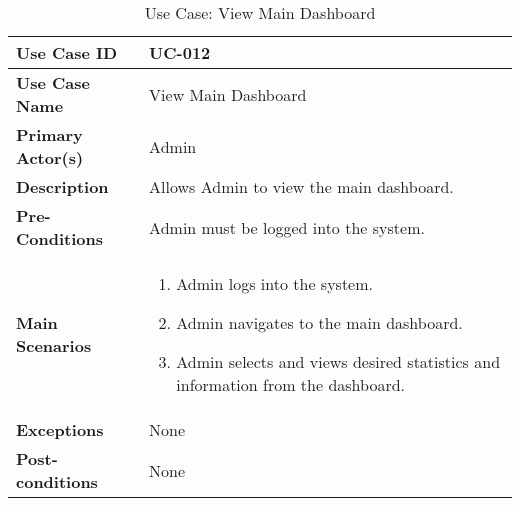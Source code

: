 \begin{table}[ht]
    \centering
    \begin{tabular}{|l|p{}|}
        \hline
        \textbf{Use Case ID} & UC-012 \\
        \hline
        \textbf{Use Case Name} & View Main Dashboard \\
        \hline
        \textbf{Primary Actor(s)} & Admin \\
        \hline
        \textbf{Description} & Allows Admin to view the main dashboard. \\
        \hline
        \textbf{Pre-Conditions} & Admin must be logged into the system. \\
        \hline
        \textbf{Main Scenarios} & 
        \begin{enumerate}[label=\arabic*.,itemsep=0pt]
            \item Admin logs into the system.
            \item Admin navigates to the main dashboard.
            \item Admin selects and views desired statistics and information from the dashboard.
        \end{enumerate} \\
        \hline
        \textbf{Exceptions} & None \\
        \hline
        \textbf{Post-conditions} & None \\
        \hline
    \end{tabular}
    \label{tab:use-case-view-main-dashboard}
    \caption{Use Case: View Main Dashboard}
\end{table}




